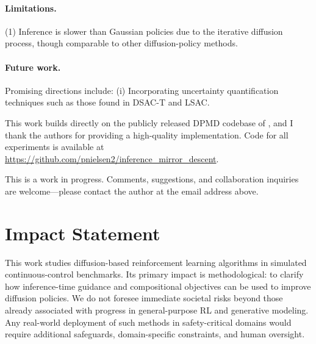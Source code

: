 \documentclass{article}
\theoremstyle{plain}
\theoremstyle{definition}
\theoremstyle{remark}
\begin{document}
\paragraph{Limitations.}
(1) Inference is slower than Gaussian policies due to the iterative diffusion process, though comparable to other diffusion-policy methods.

\paragraph{Future work.}
Promising directions include:
(i) Incorporating uncertainty quantification techniques such as those found in DSAC-T and LSAC.


\begin{ack}
This work builds directly on the publicly released DPMD codebase of \citet{ma2025soft}, and I thank the authors for providing a high-quality implementation.
Code for all experiments is available at \url{https://github.com/pnielsen2/inference_mirror_descent}.

This is a work in progress.
Comments, suggestions, and collaboration inquiries are welcome---please contact the author at the email address above.
\end{ack}

\section*{Impact Statement}

This work studies diffusion-based reinforcement learning algorithms in simulated continuous-control benchmarks.
Its primary impact is methodological: to clarify how inference-time guidance and compositional objectives can be used to improve diffusion policies.
We do not foresee immediate societal risks beyond those already associated with progress in general-purpose RL and generative modeling.
Any real-world deployment of such methods in safety-critical domains would require additional safeguards, domain-specific constraints, and human oversight.



\end{document}
